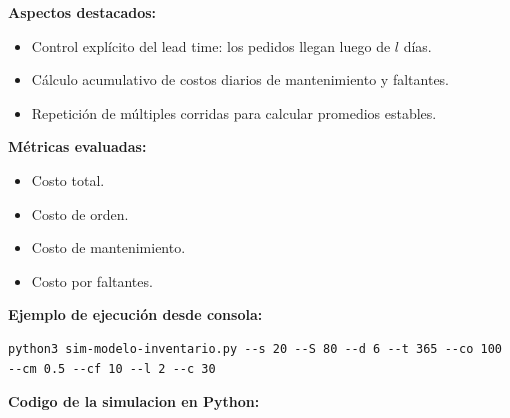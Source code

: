 \documentclass[12pt]{article}
\begin{document}
\textbf{Aspectos destacados:}
\begin{itemize}
    \item Control explícito del lead time: los pedidos llegan luego de $l$ días.
    \item Cálculo acumulativo de costos diarios de mantenimiento y faltantes.
    \item Repetición de múltiples corridas para calcular promedios estables.
\end{itemize}

\textbf{Métricas evaluadas:}
\begin{itemize}
    \item Costo total.
    \item Costo de orden.
    \item Costo de mantenimiento.
    \item Costo por faltantes.
\end{itemize}

\textbf{Ejemplo de ejecución desde consola:}
\begin{verbatim}
python3 sim-modelo-inventario.py --s 20 --S 80 --d 6 --t 365 --co 100 --cm 0.5 --cf 10 --l 2 --c 30
\end{verbatim}
\textbf{Codigo de la simulacion en Python:}
\end{document}
